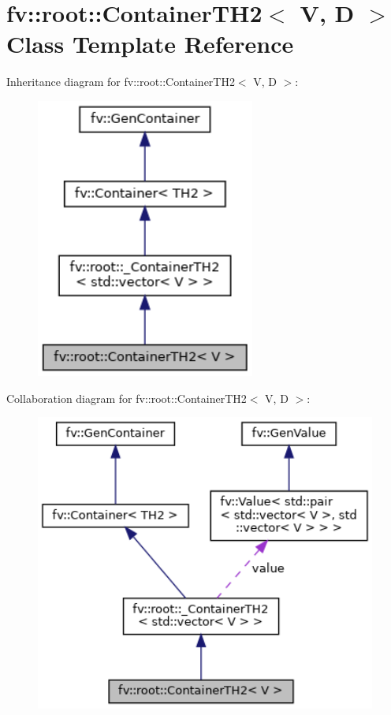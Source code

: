 \hypertarget{classfv_1_1root_1_1ContainerTH2}{}\section{fv\+:\+:root\+:\+:Container\+T\+H2$<$ V, D $>$ Class Template Reference}
\label{classfv_1_1root_1_1ContainerTH2}


Inheritance diagram for fv\+:\+:root\+:\+:Container\+T\+H2$<$ V, D $>$\+:
\nopagebreak
\begin{figure}[H]
\begin{center}
\leavevmode
\includegraphics[width=204pt]{classfv_1_1root_1_1ContainerTH2__inherit__graph}
\end{center}
\end{figure}


Collaboration diagram for fv\+:\+:root\+:\+:Container\+T\+H2$<$ V, D $>$\+:
\nopagebreak
\begin{figure}[H]
\begin{center}
\leavevmode
\includegraphics[width=350pt]{classfv_1_1root_1_1ContainerTH2__coll__graph}
\end{center}
\end{figure}
